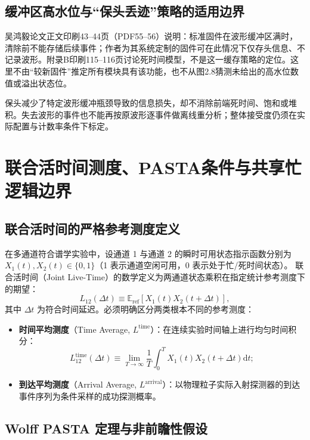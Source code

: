 \subsection{缓冲区高水位与“保头丢迹”策略的适用边界}

吴鸿毅论文正文印刷43--44页（PDF55--56）说明：标准固件在波形缓冲区满时，清除前不能存储后续事件；作者为其系统定制的固件可在此情况下仅存头信息、不记录波形。附录B印刷115--116页讨论死时间模型，不是这一缓存策略的定位。这里不由“较新固件”推定所有模块具有该功能，也不从图2.8猜测未给出的高水位数值或溢出状态位。

保头减少了特定波形缓冲瓶颈导致的信息损失，却不消除前端死时间、饱和或堆积。失去波形的事件也不能再按原波形逐事件做离线重分析；整体接受度仍须在实际配置与计数率条件下标定。

\section{联合活时间测度、PASTA条件与共享忙逻辑边界}\label{sec:appE-joint-live}

\subsection{联合活时间的严格参考测度定义}

在多通道符合谱学实验中，设通道 1 与通道 2 的瞬时可用状态指示函数分别为 $X_1(t), X_2(t) \in \{0, 1\}$（1 表示通道空闲可用，0 表示处于忙/死时间状态）。
联合活时间（Joint Live-Time）的数学定义为两通道状态乘积在指定统计参考测度下的期望：
\begin{equation}\label{eq:appE-joint-live-def}
L_{12}(\Delta t) \equiv \mathbb{E}_{\mathrm{ref}}\left[ X_1(t) X_2(t + \Delta t) \right],
\end{equation}
其中 $\Delta t$ 为符合时间延迟。必须明确区分两类根本不同的参考测度：
\begin{itemize}
\item \textbf{时间平均测度}（Time Average, $L^{\mathrm{time}}$）：在连续实验时间轴上进行均匀时间积分：
\begin{equation}\label{eq:appE-time-avg}
L_{12}^{\mathrm{time}}(\Delta t) \equiv \lim_{T \to \infty} \frac{1}{T} \int_0^T X_1(t) X_2(t + \Delta t) \mathrm{d}t;
\end{equation}
\item \textbf{到达平均测度}（Arrival Average, $L^{\mathrm{arrival}}$）：以物理粒子实际入射探测器的到达事件序列为条件采样的成功探测概率。
\end{itemize}

\subsection{Wolff PASTA 定理与非前瞻性假设}

